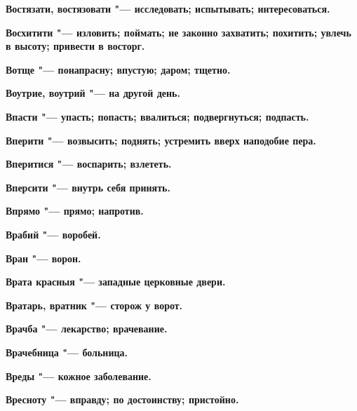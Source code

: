 \bfseries Востязати, востязовати \normalfont{} "--- исследовать; испытывать; интересоваться. 




\bfseries Восхитити \normalfont{} "--- изловить; поймать; не законно захватить; похитить; увлечь в высоту; привести в восторг. 




\bfseries Вотще \normalfont{} "--- понапрасну; впустую; даром; тщетно. 




\bfseries Воутрие, воутрий \normalfont{} "--- на другой день. 




\bfseries Впасти \normalfont{} "--- упасть; попасть; ввалиться; подвергнуться; подпасть. 




\bfseries Вперити \normalfont{} "--- возвысить; поднять; устремить вверх наподобие пера. 




\bfseries Вперитися \normalfont{} "--- воспарить; взлететь. 




\bfseries Вперсити \normalfont{} "--- внутрь себя принять. 




\bfseries Впрямо \normalfont{} "--- прямо; напротив. 




\bfseries Врабий \normalfont{} "--- воробей. 




\bfseries Вран \normalfont{} "--- ворон. 




\bfseries Врата красныя \normalfont{} "--- западные церковные двери. 




\bfseries Вратарь, вратник \normalfont{} "--- сторож у ворот. 




\bfseries Врачба \normalfont{} "--- лекарство; врачевание. 




\bfseries Врачебница \normalfont{} "--- больница. 




\bfseries Вреды \normalfont{} "--- кожное заболевание. 




\bfseries Вресноту \normalfont{} "--- вправду; по достоинству; пристойно. 




